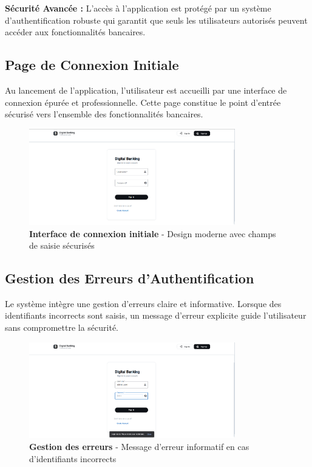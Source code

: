 \documentclass[11pt, a4paper]{article}
\begin{document}
\textbf{Sécurité Avancée :} L'accès à l'application est protégé par un système d'authentification robuste qui garantit que seuls les utilisateurs autorisés peuvent accéder aux fonctionnalités bancaires.

\subsection{Page de Connexion Initiale}

Au lancement de l'application, l'utilisateur est accueilli par une interface de connexion épurée et professionnelle. Cette page constitue le point d'entrée sécurisé vers l'ensemble des fonctionnalités bancaires.

\begin{figure}[H]
    \centering
    \includegraphics[width=0.8\textwidth]{screenshots/01_01_login_page_initial.png}
    \caption{\textbf{Interface de connexion initiale} - Design moderne avec champs de saisie sécurisés}
    \label{fig:login_initial}
\end{figure}

\subsection{Gestion des Erreurs d'Authentification}

Le système intègre une gestion d'erreurs claire et informative. Lorsque des identifiants incorrects sont saisis, un message d'erreur explicite guide l'utilisateur sans compromettre la sécurité.

\begin{figure}[H]
    \centering
    \includegraphics[width=0.8\textwidth]{screenshots/01_02_login_page_incorrect_credentials.png}
    \caption{\textbf{Gestion des erreurs} - Message d'erreur informatif en cas d'identifiants incorrects}
    \label{fig:login_incorrect}
\end{figure}
\end{document}
